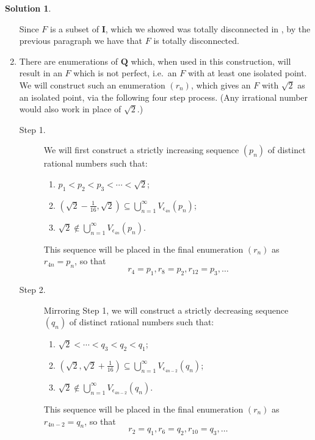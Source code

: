 \documentclass[12pt]{article}
\theoremstyle{definition}
\theoremstyle{exercise}
\theoremstyle{solution}
\newtheorem*{solution}{Solution}
\newcommand{\Q}{\mathbf{Q}}
\newcommand{\I}{\mathbf{I}}
\begin{document}
\begin{solution}
\begin{enumerate}
        Since \( F \) is a subset of \( \I \), which we showed was totally disconnected in , by the previous paragraph we have that \( F \) is totally disconnected.

        \item There are enumerations of \( \Q \) which, when used in this construction, will result in an \( F \) which is not perfect, i.e.\ an \( F \) with at least one isolated point. We will construct such an enumeration \( (r_n) \), which gives an \( F \) with \( \sqrt{2} \) as an isolated point, via the following four step process. (Any irrational number would also work in place of \( \sqrt{2} \).)
        \begin{description}
            \item[Step 1.] We will first construct a strictly increasing sequence \( (p_n) \) of distinct rational numbers such that:
            \begin{enumerate}[itemsep=8pt, leftmargin=44pt, label=(1.\arabic*)]
                \item \( p_1 < p_2 < p_3 < \cdots < \sqrt{2} \);

                \item \( \left( \sqrt{2} - \tfrac{1}{16}, \sqrt{2} \right) \subseteq \bigcup_{n=1}^{\infty} V_{\epsilon_{4n}}(p_n) \);

                \item \( \sqrt{2} \not\in \bigcup_{n=1}^{\infty} V_{\epsilon_{4n}}(p_n) \).
            \end{enumerate}
            This sequence will be placed in the final enumeration \( (r_n) \) as \( r_{4n} = p_n \), so that
            \[
                r_4 = p_1, r_8 = p_2, r_{12} = p_3, \ldots
            \]

            \item[Step 2.] Mirroring Step 1, we will construct a strictly decreasing sequence \( (q_n) \) of distinct rational numbers such that:
            \begin{enumerate}[itemsep=8pt, leftmargin=44pt, label=(2.\arabic*)]
                \item \( \sqrt{2} < \cdots < q_3 < q_2 < q_1 \);

                \item \( \left( \sqrt{2}, \sqrt{2} + \tfrac{1}{16} \right) \subseteq \bigcup_{n=1}^{\infty} V_{\epsilon_{4n-2}}(q_n) \);

                \item \( \sqrt{2} \not\in \bigcup_{n=1}^{\infty} V_{\epsilon_{4n-2}}(q_n) \).
            \end{enumerate}
            This sequence will be placed in the final enumeration \( (r_n) \) as \( r_{4n-2} = q_n \), so that
            \[
                r_2 = q_1, r_6 = q_2, r_{10} = q_3, \ldots
            \]


\end{description}
\end{enumerate}
\end{solution}
\end{document}
